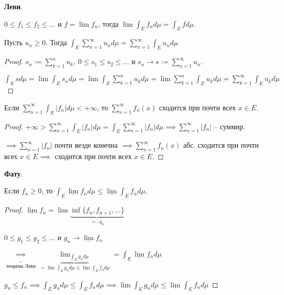\begin{theorem}
    \textbf{Леви}.

    $0 \leq f_1 \leq f_2 \leq \dots$ и $f = \lim{f_n}$, тогда $\lim{\int_E{f_n d \mu}} = \int_E f d \mu$.
\end{theorem}
\begin{consequence}
    Пусть $u_n \geq 0.$ Тогда $\int_E {\sum_{n=1}^{\infty} u_n d \mu} = \sum_{n=1}^{\infty} \int_E {u_n d \mu}$
\end{consequence}
\begin{proof}
    $s_n := \sum_{k=1}^{n} u_k, \ 0 \leq s_1 \leq s_2 \leq \dots$ и $s_n \rightarrow s := \sum_{n=1}^{\infty} u_n$.

    $\int_E{s d \mu} = \lim{\int_E{s_n d \mu}} = \lim{\int_E{\sum_{k=1}^{n} u_k d \mu}} = \lim{\sum_{k=1}^{n} \int_E{u_k d \mu}} = \sum_{k=1}^{\infty} \int_E{u_k d \mu}$
\end{proof}

\begin{consequence}
    Если $\sum_{n=1}^{\infty} \int_E{|f_n| d \mu} < +\infty$, то $\sum_{n=1}^{\infty} f_n(x)$ сходится при почти всех $x \in E$.
\end{consequence}
\begin{proof}
    $+\infty > \sum_{n=1}^{\infty} \int_E{|f_n| d \mu} = \int_E{\sum_{n=1}^{\infty} |f_n| d \mu} \implies \sum_{n=1}^{\infty} |f_n|$ -- суммир.

    $\implies \sum_{n=1}^{\infty} |f_n|$ почти везде конечна $\implies \sum_{n=1}^{\infty} f_n(x)$ абс. сходится при почти всех $x \in E \implies$ сходится при почти всех $x \in E$.
\end{proof}

\begin{lemma}
    \textbf{Фату}.

    Если $f_n \geq 0$, то $\int_E{\underline{\lim}{f_n d \mu}} \leq \underline{\lim}{\int_E{f_n d \mu}}$.
\end{lemma}
\begin{proof}
    $\underline{\lim}{f_n} = \lim{\underbrace{\inf\{ f_n, f_{n+1}, \dots \}}_{=: g_n}}$

    $0 \leq g_1 \leq g_2 \leq \dots$ и $g_n \rightarrow \underline{\lim}{f_n}$

    $\underbrace{\implies}_{\text{теорема Леви}} \underbrace{\lim_{\int_E{g_n d \mu}}}_{= \underline{\lim}{\int_E{g_n d \mu}} \leq \underline{\lim}{\int_E{f_n d \mu}}} = \int_E{\underline{\lim}{f_n d \mu}}$

    $g_n \leq f_n \implies \int_E{g_n d \mu} \leq \int_E{f_n d \mu} \implies \underline{\lim}{\int_E{g_n d \mu}} \leq \underline{\lim}{\int_E{f_n d \mu}}$
\end{proof}

